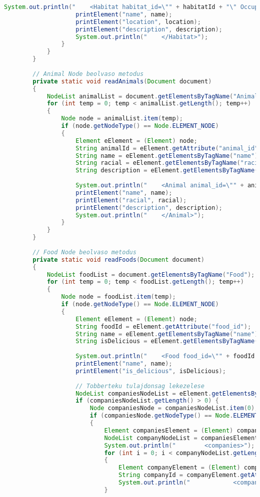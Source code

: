 \documentclass[12pt]{report}
\begin{document}
\begin{lstlisting}[caption={DOMReadKLNSPG.java} adatolvasó program, language=Java]
					System.out.println("    <Habitat habitat_id=\"" + habitatId + "\" Occupy=\"" + occupy + "\">");
					printElement("name", name);
					printElement("location", location);
					printElement("description", description);
					System.out.println("    </Habitat>");
				}
			}
		}
		
		// Animal Node beolvaso metodus
		private static void readAnimals(Document document) 
		{
			NodeList animalList = document.getElementsByTagName("Animal");
			for (int temp = 0; temp < animalList.getLength(); temp++) 
			{
				Node node = animalList.item(temp);
				if (node.getNodeType() == Node.ELEMENT_NODE) 
				{
					Element eElement = (Element) node;
					String animalId = eElement.getAttribute("animal_id");
					String name = eElement.getElementsByTagName("name").item(0).getTextContent();
					String racial = eElement.getElementsByTagName("racial").item(0).getTextContent();
					String description = eElement.getElementsByTagName("description").item(0).getTextContent();
					
					System.out.println("    <Animal animal_id=\"" + animalId + "\">");
					printElement("name", name);
					printElement("racial", racial);
					printElement("description", description);
					System.out.println("    </Animal>");
				}
			}
		}
		
		// Food Node beolvaso metodus
		private static void readFoods(Document document) 
		{
			NodeList foodList = document.getElementsByTagName("Food");
			for (int temp = 0; temp < foodList.getLength(); temp++) 
			{
				Node node = foodList.item(temp);
				if (node.getNodeType() == Node.ELEMENT_NODE) 
				{
					Element eElement = (Element) node;
					String foodId = eElement.getAttribute("food_id");
					String name = eElement.getElementsByTagName("name").item(0).getTextContent();
					String isDelicious = eElement.getElementsByTagName("is_delicious").item(0).getTextContent();
					
					System.out.println("    <Food food_id=\"" + foodId + "\">");
					printElement("name", name);
					printElement("is_delicious", isDelicious);
					
					// Tobberteku tulajdonsag lekezelese
					NodeList companiesNodeList = eElement.getElementsByTagName("companies");
					if (companiesNodeList.getLength() > 0) {
						Node companiesNode = companiesNodeList.item(0);
						if (companiesNode.getNodeType() == Node.ELEMENT_NODE) 
						{
							Element companiesElement = (Element) companiesNode;
							NodeList companyNodeList = companiesElement.getElementsByTagName("company");
							System.out.println("        <companies>");
							for (int i = 0; i < companyNodeList.getLength(); i++) 
							{
								Element companyElement = (Element) companyNodeList.item(i);
								String companyId = companyElement.getAttribute("id");
								System.out.println("            <company id=\"" + companyId + "\">" + companyElement.getTextContent() + "</company>");
							}
							

\end{lstlisting}
\end{document}
